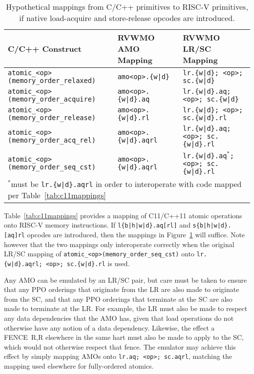 \begin{table}[h!]
  \footnotesize
  \begin{tabular}{|l|l|l|}
    \hline
    C/C++ Construct                               & RVWMO AMO Mapping       & RVWMO LR/SC Mapping\\
    \hline
    \tt atomic\_<op>(memory\_order\_relaxed)  & \tt amo<op>.\{w|d\}      & \tt lr.\{w|d\}; <op>; sc.\{w|d\} \\
    \hline
    \tt atomic\_<op>(memory\_order\_acquire)  & \tt amo<op>.\{w|d\}.aq   & \tt lr.\{w|d\}.aq; <op>; sc.\{w|d\} \\
    \hline
    \tt atomic\_<op>(memory\_order\_release)  & \tt amo<op>.\{w|d\}.rl   & \tt lr.\{w|d\}; <op>; sc.\{w|d\}.rl \\
    \hline
    \tt atomic\_<op>(memory\_order\_acq\_rel) & \tt amo<op>.\{w|d\}.aqrl & \tt lr.\{w|d\}.aq; <op>; sc.\{w|d\}.rl \\
    \hline
    \tt atomic\_<op>(memory\_order\_seq\_cst) & \tt amo<op>.\{w|d\}.aqrl & \tt lr.\{w|d\}.aq$^*$; <op>; sc.\{w|d\}.rl \\
    \hline
    \multicolumn{3}{l}{$^*$must be {\tt lr.\{w|d\}.aqrl} in order to interoperate with code mapped per Table~\ref{tab:c11mappings}}
  \end{tabular}
  \caption{Hypothetical mappings from C/C++ primitives to RISC-V primitives, if native load-acquire and store-release opcodes are introduced.}
  \label{tab:c11mappings_hypothetical}
\end{table}

Table~\ref{tab:c11mappings} provides a mapping of C11/C++11 atomic operations onto RISC-V memory instructions.
If {\tt l\{b|h|w|d\}.aq[rl]} and {\tt s\{b|h|w|d\}.[aq]rl} opcodes are introduced, then the mappings in Figure~\ref{tab:c11mappings_hypothetical} will suffice.
Note however that the two mappings only interoperate correctly when the original LR/SC mapping of {\tt atomic\_<op>(memory\_order\_seq\_cst)} onto {\tt lr.\{w|d\}.aqrl;~<op>;~sc.\{w|d\}.rl} is used.


Any AMO can be emulated by an LR/SC pair, but care must be taken to ensure that any PPO orderings that originate from the LR are also made to originate from the SC, and that any PPO orderings that terminate at the SC are also made to terminate at the LR.
For example, the LR must also be made to respect any data dependencies that the AMO has, given that load operations do not otherwise have any notion of a data dependency.
Likewise, the effect a FENCE~R,R elsewhere in the same hart must also be made to apply to the SC, which would not otherwise respect that fence.
The emulator may achieve this effect by simply mapping AMOs onto {\tt lr.aq;~<op>;~sc.aqrl}, matching the mapping used elsewhere for fully-ordered atomics.


